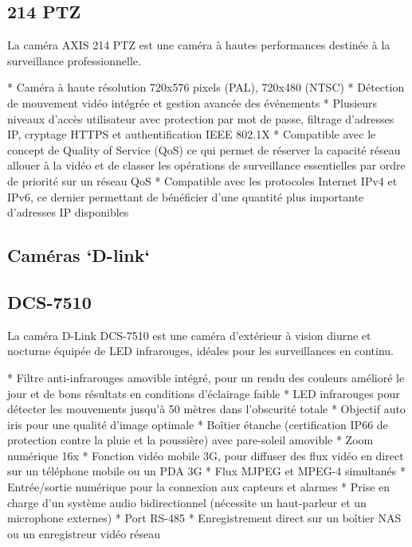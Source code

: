    	\subsection{214 PTZ}
La caméra AXIS 214 PTZ est une caméra à hautes performances destinée à la
surveillance professionnelle.

	* Caméra à haute résolution 720x576 pixels (PAL), 720x480 (NTSC)
	* Détection de mouvement vidéo intégrée et gestion avancée des événements
	* Plusieurs niveaux d’accès utilisateur avec protection par mot de passe,
 	filtrage d’adresses IP, cryptage HTTPS et authentification IEEE 802.1X 
 	* Compatible avec le concept de Quality of Service (QoS) ce qui permet de
 	réserver la capacité réseau allouer à la vidéo et de classer les opérations de
 	surveillance essentielles par ordre de priorité sur un réseau QoS
 	* Compatible avec les protocoles Internet IPv4 et IPv6, ce dernier permettant
 	de bénéficier d’une quantité plus importante d’adresses IP disponibles

\subsection{Caméras `D-link`}
	\subsection{DCS-7510}
La caméra D-Link DCS-7510 est 	une caméra d'extérieur à vision diurne et
nocturne équipée de LED infrarouges, idéales pour les surveillances en continu.

	* Filtre anti-infrarouges amovible intégré, pour un rendu des couleurs amélioré
	le jour et de bons résultats en conditions d'éclairage faible 
	* LED infrarouges
	pour détecter les mouvements jusqu'à 50 mètres dans l'obscurité totale 
	* Objectif auto iris pour une qualité d’image optimale 
	* Boîtier étanche (certification IP66 de protection contre la pluie et la
	poussière) avec pare-soleil amovible 
	* Zoom numérique 16x 
	* Fonction vidéo mobile 3G, pour diffuser des flux vidéo en direct sur un
	téléphone mobile ou un PDA 3G 
	* Flux MJPEG et MPEG-4 simultanés 
	* Entrée/sortie numérique pour la connexion aux capteurs et alarmes 
	* Prise en charge d'un système audio bidirectionnel (nécessite un haut-parleur
	et un microphone externes) 
	* Port RS-485
	* Enregistrement direct sur un boîtier NAS ou un enregistreur vidéo réseau
		
